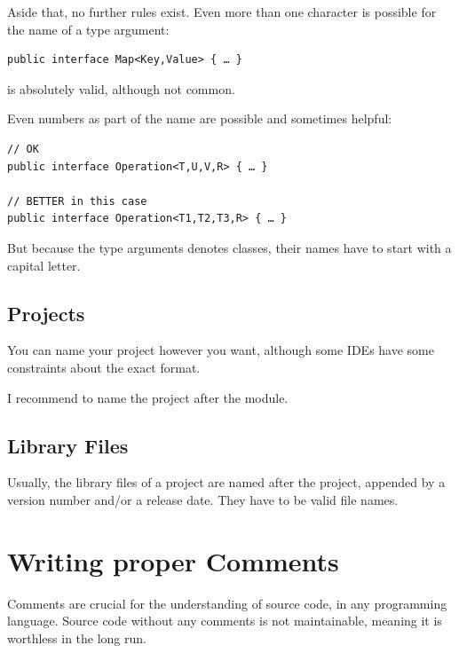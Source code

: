\documentclass[11pt,a4paper, titlepage, parskip=half, headsepline, footsepline, cleardoublepage=current, headheight=1cm]{scrbook}
\begin{document}
Aside that, no further rules exist. Even more than one character is possible for the name of a type argument: 
\begin{lstlisting}
public interface Map<Key,Value> { … }
\end{lstlisting}
is absolutely valid, although not common.

Even numbers as part of the name are possible and sometimes helpful:
\begin{lstlisting}
// OK
public interface Operation<T,U,V,R> { … }

// BETTER in this case
public interface Operation<T1,T2,T3,R> { … }
\end{lstlisting}
 

But because the type arguments denotes classes, their names have to start with a capital letter.


\section{Projects}\label{sec:Projects}
You can name your project however you want, although some IDEs have some constraints about the exact format.

I recommend to name the project after the module.


\section{Library Files}\label{sec:LibraryFiles}
Usually, the library files of a project are named after the project, appended by a version number and/or a release date. They have to be valid file names.


\chapter{Writing proper Comments}\label{sec:WritingProperComments}
Comments are crucial for the understanding of source code, in any programming language. Source code without any comments is not maintainable, meaning it is worthless in the long run.
\end{document}
